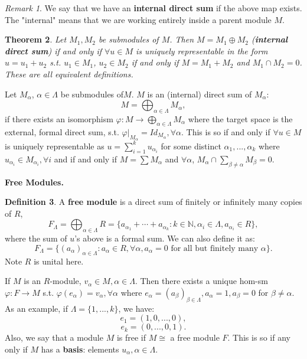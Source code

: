 \documentclass[12pt]{amsbook}
\theoremstyle{plain}
\newtheorem{theorem}{Theorem}[chapter]
\numberwithin{section}{chapter}
\numberwithin{equation}{chapter}
\theoremstyle{definition}
\newtheorem{Def}[theorem]{Definition}
\theoremstyle{remark}
\newtheorem{rem}[theorem]{Remark}
\newcommand{\n}{\mathbb{N}}
\renewcommand{\phi}{\varphi}
\begin{document}
\begin{rem}
We say that we have an \textbf{internal direct sum} if the above map exists. The "internal" means that we are working entirely inside a parent module $M$. 
\end{rem}

\begin{theorem} \label{thm10.67}
Let $M_1,M_2$ be submodules of $M$. Then $M = M_1 \oplus M_2$ (\textbf{internal direct sum}) if and only if $\forall u \in M$ is uniquely representable in the form $u = u_1 + u_2$ s.t. $u_1 \in M_1$, $u_2 \in M_2$ if and only if $M = M_1 + M_2$ and $M_1 \cap M_2 = 0$. These are all equivalent definitions. 
\end{theorem}
Let $M_\alpha$, $\alpha \in \Lambda$ be submodules of$M$. $M$ is an (internal) direct sum of $M_\alpha$:
$$
M = \bigoplus_{\alpha \in \Lambda}M_\alpha,
$$
if there exists an isomorphism $\phi: M \to \bigoplus_{\alpha \in \Lambda}M_\alpha$ where the target space is the external, formal direct sum, s.t. $\phi|_{M_\alpha} = Id_{M_\alpha}, \forall \alpha$. This is so if and only if $\forall u \in M$ is uniquely representable as $u = \sum_{i = 1}^k u_{\alpha_i}$ for some distinct $\alpha_1,...,\alpha_k$ where $u_{\alpha_i} \in M_{\alpha_i},\forall i$ and if and only if $M = \sum M_\alpha$ and $\forall \alpha$, $M_\alpha \cap \sum_{\beta \neq \alpha}M_\beta = 0$. 

\textbf{Free Modules. }
\begin{Def}
A \textbf{free module} is a direct sum of finitely or infinitely many copies of $R$, 
$$
F_\Lambda = \bigoplus_{\alpha \in \Lambda}R = \{a_{\alpha_1} + \cdots + a_{\alpha_k}: k \in \n,\alpha_i \in \Lambda,a_{\alpha_i} \in R\},
$$
where the sum of $u$'s above is a formal sum. We can also define it as: 
$$
F_\Lambda = \{(a_\alpha)_{\alpha \in \Lambda}: a_\alpha \in R,\forall \alpha,a_\alpha = 0 \text{ for all but finitely many }\alpha\}.
$$
Note $R$ is unital here. 
\end{Def}
If $M$ is an $R$-module, $v_\alpha \in M,\alpha \in \Lambda$. Then there exists a unique hom-sm $\phi: F \to M$ s.t. $\phi(e_\alpha) = v_\alpha,\forall \alpha$ where $e_\alpha = (a_\beta)_{\beta \in \Lambda},a_\alpha = 1,a_\beta = 0$ for $\beta \neq \alpha$. As an example, if $\Lambda = \{1,...,k\}$, we have: 
$$
e_1 = (1,0,...,0),
$$
$$
e_k = (0,...,0,1). 
$$
Also, we say that a module $M$ is free if $M \cong$ a free module $F$. This is so if any only if $M$ has a \textbf{basis}: elements $u_\alpha,\alpha \in \Lambda$.  
 
\end{document}
